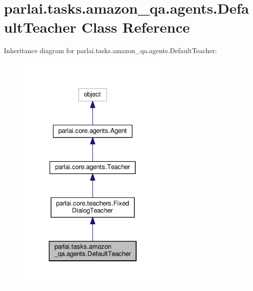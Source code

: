 \hypertarget{classparlai_1_1tasks_1_1amazon__qa_1_1agents_1_1DefaultTeacher}{}\section{parlai.\+tasks.\+amazon\+\_\+qa.\+agents.\+Default\+Teacher Class Reference}
\label{classparlai_1_1tasks_1_1amazon__qa_1_1agents_1_1DefaultTeacher}


Inheritance diagram for parlai.\+tasks.\+amazon\+\_\+qa.\+agents.\+Default\+Teacher\+:
\nopagebreak
\begin{figure}[H]
\begin{center}
\leavevmode
\includegraphics[width=214pt]{d9/d02/classparlai_1_1tasks_1_1amazon__qa_1_1agents_1_1DefaultTeacher__inherit__graph}
\end{center}
\end{figure}


